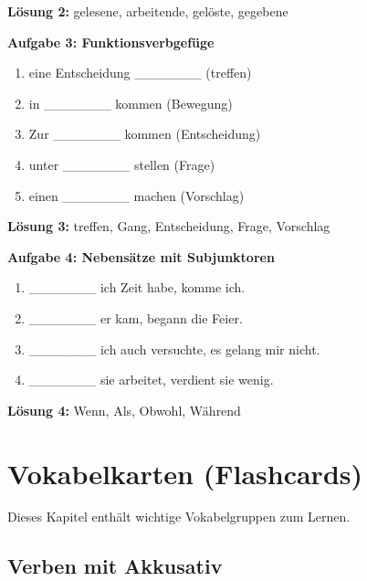 \bigskip
\textbf{Lösung 2:} gelesene, arbeitende, gelöste, gegebene

\bigskip
\noindent\textbf{Aufgabe 3: Funktionsverbgefüge}

\begin{enumerate}
    \item eine Entscheidung \_\_\_\_\_\_\_ (treffen)
    \item in \_\_\_\_\_\_\_ kommen (Bewegung)
    \item Zur \_\_\_\_\_\_\_ kommen (Entscheidung)
    \item unter \_\_\_\_\_\_\_ stellen (Frage)
    \item einen \_\_\_\_\_\_\_ machen (Vorschlag)
\end{enumerate}

\bigskip
\textbf{Lösung 3:} treffen, Gang, Entscheidung, Frage, Vorschlag

\bigskip
\noindent\textbf{Aufgabe 4: Nebensätze mit Subjunktoren}

\begin{enumerate}
    \item \_\_\_\_\_\_\_ ich Zeit habe, komme ich.
    \item \_\_\_\_\_\_\_ er kam, begann die Feier.
    \item \_\_\_\_\_\_\_ ich auch versuchte, es gelang mir nicht.
    \item \_\_\_\_\_\_\_ sie arbeitet, verdient sie wenig.
\end{enumerate}

\bigskip
\textbf{Lösung 4:} Wenn, Als, Obwohl, Während

\chapterend

\chapter{Vokabelkarten (Flashcards)}

Dieses Kapitel enthält wichtige Vokabelgruppen zum Lernen.

\section{Verben mit Akkusativ}


